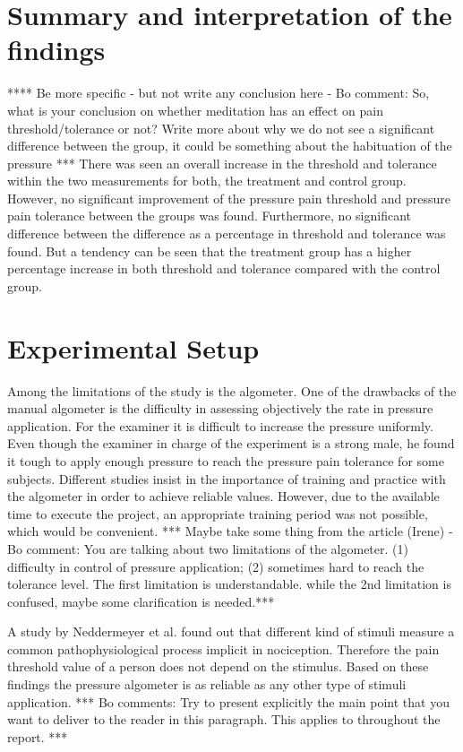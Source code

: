 \section{Summary and interpretation of the findings}
**** Be more specific - but not write any conclusion here - Bo comment: So, what is your conclusion on whether meditation has an effect on pain threshold/tolerance or not? Write more about why we do not see a significant difference between the group, it could be something about the habituation of the pressure  ***
There was seen an overall increase in the threshold and tolerance within the two measurements for both, the treatment and control group. However, no significant improvement of the pressure pain threshold and pressure pain tolerance between the groups was found. Furthermore, no significant difference between the difference as a percentage in threshold and tolerance was found. But a tendency can be seen that the treatment group has a higher percentage increase in both threshold and tolerance compared with the control group. 


\section{Experimental Setup}
Among the limitations of the study is the algometer. One of the drawbacks of the manual algometer is the difficulty in assessing objectively the rate in pressure application. For the examiner it is difficult to increase the pressure uniformly. Even though the examiner in charge of the experiment is a strong male, he found it tough to apply enough pressure to reach the pressure pain tolerance for some subjects. Different studies insist in the importance of training and practice with the algometer in order to achieve reliable values. However, due to the available time to execute the project, an appropriate training period was not possible, which would be convenient.
*** Maybe take some thing from the article (Irene) - Bo comment: You are talking about two limitations of the algometer. (1) difficulty in control of pressure application; (2) sometimes hard to reach the tolerance level. The first limitation is understandable. while the 2nd limitation is confused, maybe some clarification is needed.***

A study by Neddermeyer et al. \cite{Neddermeyer2007} found out that different kind of stimuli  measure a common pathophysiological process implicit in nociception. Therefore the pain threshold value of a person does not depend on the stimulus. Based on these findings the pressure algometer is as reliable as any other type of stimuli application.
*** Bo comments: Try to present explicitly the main point that you want to deliver to the reader in this paragraph. This applies to throughout the report. ***

